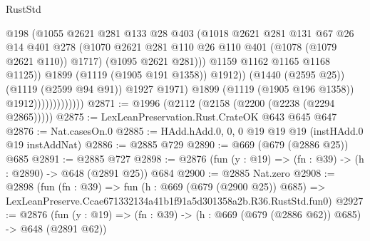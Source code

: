 \begin{lexlean}{RustStd}
\begin{coremodule}
                                        @198
                                        (@1055
                                          @2621
                                          @281
                                          @133
                                          @28
                                          @403
                                          (@1018
                                            @2621
                                            @281
                                            @131
                                            @67
                                            @26
                                            @14
                                            @401
                                            @278
                                            (@1070
                                              @2621
                                              @281
                                              @110
                                              @26
                                              @110
                                              @401
                                              (@1078 (@1079 @2621 @110))
                                              @1717)
                                            (@1095 @2621 @281)))
                                        @1159
                                        @1162
                                        @1165
                                        @1168
                                        @1125))
                                    @1899
                                    (@1119 (@1905 @191 @1358))
                                    @1912))
                                (@1440 (@2595 @25))
                                (@1119 (@2599 @94 @91))
                                @1927
                                @1971)
                              @1899
                              (@1119 (@1905 @196 @1358))
                              @1912)))))))))))))
@2871 := @1996 (@2112 (@2158 (@2200 (@2238 (@2294 @2865)))))
@2875 := LexLeanPreservation.Rust.CrateOK @643 @645 @647
@2876 := Nat.casesOn.{0}
@2885 := HAdd.hAdd.{0, 0, 0} @19 @19 @19 (instHAdd.{0} @19 instAddNat)
@2886 := @2885 @729
@2890 := @669 (@679 (@2886 @25)) @685
@2891 := @2885 @727
@2898 := @2876 (fun (y : @19) => (fn : @39) -> (h : @2890) -> @648 (@2891 @25)) @684
@2900 := @2885 Nat.zero
@2908 := @2898
    (fun (fn : @39) =>
    fun (h : @669 (@679 (@2900 @25)) @685) =>
    LexLeanPreserve.Ccae671332134a41b1f91a5d301358a2b.R36.RustStd.fun0)
@2927 := @2876
    (fun (y : @19) => (fn : @39) -> (h : @669 (@679 (@2886 @62)) @685) -> @648 (@2891 @62))

\end{coremodule}
\end{lexlean}
